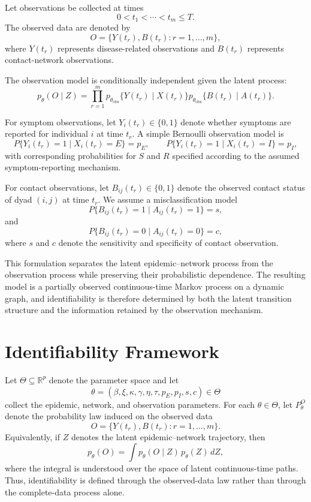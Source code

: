 \documentclass[10pt]{article}
\begin{document}
Let observations be collected at times
\[
0<t_1<\cdots<t_m\le T.
\]
The observed data are denoted by
\[
O=\{Y(t_r),B(t_r):r=1,\ldots,m\},
\]
where $Y(t_r)$ represents disease-related observations and $B(t_r)$ represents contact-network observations.

The observation model is conditionally independent given the latent process:
\[
p_\theta(O\mid Z)
=
\prod_{r=1}^m
p_{\theta_{\mathrm{obs}}}\{Y(t_r)\mid X(t_r)\}
p_{\theta_{\mathrm{obs}}}\{B(t_r)\mid A(t_r)\}.
\]

For symptom observations, let $Y_i(t_r)\in\{0,1\}$ denote whether symptoms are reported for individual $i$ at time $t_r$. A simple Bernoulli observation model is
\[
P\{Y_i(t_r)=1\mid X_i(t_r)=E\}=p_E,
\qquad
P\{Y_i(t_r)=1\mid X_i(t_r)=I\}=p_I,
\]
with corresponding probabilities for $S$ and $R$ specified according to the assumed symptom-reporting mechanism.

For contact observations, let $B_{ij}(t_r)\in\{0,1\}$ denote the observed contact status of dyad $(i,j)$ at time $t_r$. We assume a misclassification model
\[
P\{B_{ij}(t_r)=1\mid A_{ij}(t_r)=1\}=s,
\]
and
\[
P\{B_{ij}(t_r)=0\mid A_{ij}(t_r)=0\}=c,
\]
where $s$ and $c$ denote the sensitivity and specificity of contact observation.

This formulation separates the latent epidemic--network process from the observation process while preserving their probabilistic dependence. The resulting model is a partially observed continuous-time Markov process on a dynamic graph, and identifiability is therefore determined by both the latent transition structure and the information retained by the observation mechanism.

\section{Identifiability Framework}
\label{sec3:iden}
Let $\Theta\subseteq\mathbb{R}^p$ denote the parameter space and let
\[
\theta=
(\beta,\xi,\kappa,\gamma,\eta,\tau,p_E,p_I,s,c)\in\Theta
\]
collect the epidemic, network, and observation parameters. For each $\theta\in\Theta$, let $P_\theta^O$ denote the probability law induced on the observed data
\[
O=\{Y(t_r),B(t_r):r=1,\ldots,m\}.
\]
Equivalently, if $Z$ denotes the latent epidemic--network trajectory, then
\[
p_\theta(O)
=
\int p_\theta(O\mid Z)\,p_\theta(Z)\,dZ,
\]
where the integral is understood over the space of latent continuous-time paths. Thus, identifiability is defined through the observed-data law rather than through the complete-data process alone.
\end{document}
